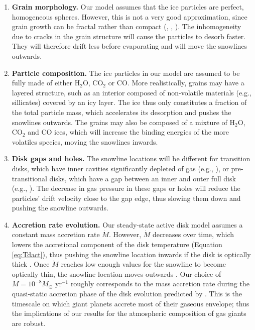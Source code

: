 \documentclass[apj]{emulateapj}
\begin{document}
\begin{enumerate}
\item \textbf{Grain morphology.} Our model assumes that the ice particles are perfect, homogeneous spheres. However, this is not a very good approximation, since grain growth can be fractal rather than compact (\citealt{zsom10}, \citealt{okuzumi12}, \citealt{krijt15}). The inhomogeneity due to cracks in the grain structure will cause the particles to desorb faster. They will therefore drift less before evaporating and will move the snowlines outwards.

\item \textbf{Particle composition.} The ice particles in our model are assumed to be fully made of either H$_2$O, CO$_2$ or CO. More realistically, grains may have a layered structure, such as an interior composed of non-volatile materials (e.g., sillicates) covered by an icy layer. The ice thus only constitutes a fraction of the total particle mass, which accelerates its desorption and pushes the snowlines outwards. The grains may also be composed of a mixture of H$_2$O, CO$_2$ and CO ices, which will increase the binding energies of the more volatiles species, moving %
the snowlines inwards. 


\item \textbf{Disk gaps and holes.} The snowline locations will be different for transition disks, which have inner cavities significantly depleted of gas (e.g., \citealt{espaillat12}), or pre-transitional disks, which have a gap between an inner and outer full disk (e.g., \citealt{kraus11}). The decrease in gas pressure in these gaps or holes will reduce the particles' drift velocity close to the gap edge, thus slowing them down and pushing the snowline outwards.

\item \textbf{Accretion rate evolution.} Our steady-state active disk model assumes a constant mass accretion rate $\dot{M}$. However, $\dot{M}$ decreases over time, which lowers the accretional component of the disk temperature (Equation \ref{eq:Tdact}), thus pushing the snowline location inwards if the disk is optically thick \citep{garaud07}. Once $\dot{M}$ reaches low enough values for the snowline to become optically thin, the snowline location moves outwards \citep{garaud07}. Our choice of $\dot{M}=10^{-8} M_{\odot}$ yr$^{-1}$ roughly corresponds to the mass accretion rate during the quasi-static accretion phase of the disk evolution predicted by \citet{garaud07}. This is the timescale on which giant planets accrete most of their gaseous envelope; thus the implications of our results for the atmospheric composition of gas giants are robust.


\end{enumerate}
\end{document}
